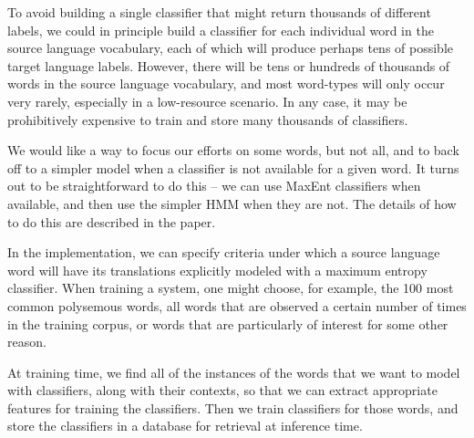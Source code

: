 To avoid building a single classifier that might return
thousands of different labels, we could in principle build a classifier for
each individual word in the source language vocabulary, each of which will
produce perhaps tens of possible target language labels. However, there will be
tens or hundreds of thousands of words in the source language vocabulary, and
most word-types will only occur very rarely, especially in a low-resource
scenario.
In any case, it may be prohibitively expensive to train and store many
thousands of classifiers.

We would like a way to focus our efforts on some words, but not all, and to
back off to a simpler model when a classifier is not available for a given
word. It turns out to be straightforward to do this --  we can use MaxEnt
classifiers when available, and then use the simpler HMM when they are not. The
details of how to do this are described in the paper.

In the implementation, we can specify criteria under which a source language
word will have its translations explicitly modeled with a maximum entropy
classifier. When training a system, one might choose, for example, the 100 most
common polysemous words, all words that are observed a certain number of times
in the training corpus, or words that are particularly of interest for some
other reason.

At training time, we find all of the instances of the words that we want to
model with classifiers, along with their contexts, so that we can extract
appropriate features for training the classifiers. Then we train classifiers
for those words, and store the classifiers in a database for retrieval at
inference time.


